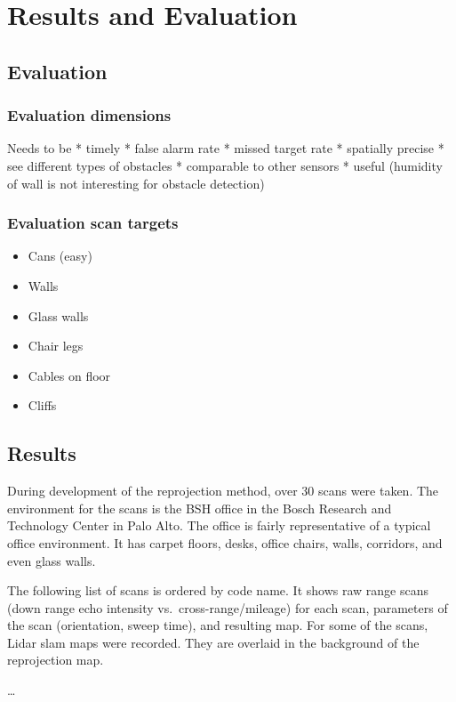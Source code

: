 \chapter{Results and Evaluation}\label{results-and-evaluation}

\section{Evaluation}\label{evaluation}

\subsection{Evaluation dimensions}\label{evaluation-dimensions}

Needs to be * timely * false alarm rate * missed target rate * spatially
precise * see different types of obstacles * comparable to other sensors
* useful (humidity of wall is not interesting for obstacle detection)

\subsection{Evaluation scan targets}\label{evaluation-scan-targets}

\begin{itemize}
\tightlist
\item
  Cans (easy)
\item
  Walls
\item
  Glass walls
\item
  Chair legs
\item
  Cables on floor
\item
  Cliffs
\end{itemize}

\section{Results}\label{results}

During development of the reprojection method, over 30 scans were taken.
The environment for the scans is the BSH office in the Bosch Research
and Technology Center in Palo Alto. The office is fairly representative
of a typical office environment. It has carpet floors, desks, office
chairs, walls, corridors, and even glass walls.

The following list of scans is ordered by code name. It shows raw range
scans (down range echo intensity vs.~cross-range/mileage) for each scan,
parameters of the scan (orientation, sweep time), and resulting map. For
some of the scans, Lidar slam maps were recorded. They are overlaid in
the background of the reprojection map.

\ldots{}